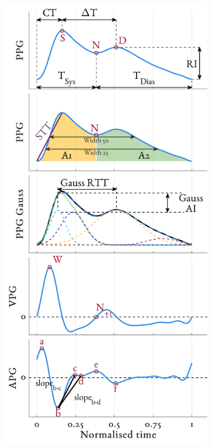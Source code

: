 \documentclass[fleqn,10pt]{wlscirep}
\begin{document}
\begin{figure}[ht]
	\centering
	\begin{subfigure}{.24\textwidth}
		\centering
		\includegraphics[height = \figHeight]{PPG_feats_rest.png}

\end{subfigure}
\end{figure}
\end{document}
